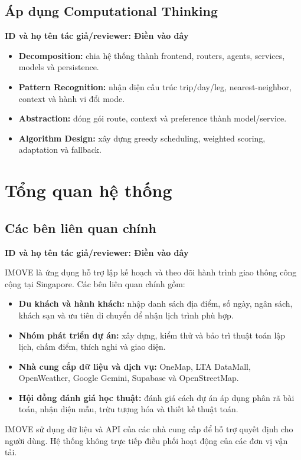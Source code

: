 \documentclass[12pt,a4paper]{article}
\newcommand{\tacgia}{%
  \begin{tcolorbox}[colback=blue!3,colframe=blue!25,boxrule=0.4pt,arc=1mm]
    \small\textbf{ID và họ tên tác giả/reviewer: Điền vào đây}
  \end{tcolorbox}
}
\begin{document}
\subsection{Áp dụng Computational Thinking}
\tacgia

\begin{itemize}
    \item \textbf{Decomposition:} chia hệ thống thành frontend, routers, agents, services, models và persistence.
    \item \textbf{Pattern Recognition:} nhận diện cấu trúc trip/day/leg, nearest-neighbor, context và hành vi đổi mode.
    \item \textbf{Abstraction:} đóng gói route, context và preference thành model/service.
    \item \textbf{Algorithm Design:} xây dựng greedy scheduling, weighted scoring, adaptation và fallback.
\end{itemize}

\section{Tổng quan hệ thống}

\subsection{Các bên liên quan chính}
\tacgia

IMOVE là ứng dụng hỗ trợ lập kế hoạch và theo dõi hành trình giao thông công cộng tại Singapore. Các bên liên quan chính gồm:

\begin{itemize}
    \item \textbf{Du khách và hành khách:} nhập danh sách địa điểm, số ngày, ngân sách, khách sạn và ưu tiên di chuyển để nhận lịch trình phù hợp.
    \item \textbf{Nhóm phát triển dự án:} xây dựng, kiểm thử và bảo trì thuật toán lập lịch, chấm điểm, thích nghi và giao diện.
    \item \textbf{Nhà cung cấp dữ liệu và dịch vụ:} OneMap, LTA DataMall, OpenWeather, Google Gemini, Supabase và OpenStreetMap.
    \item \textbf{Hội đồng đánh giá học thuật:} đánh giá cách dự án áp dụng phân rã bài toán, nhận diện mẫu, trừu tượng hóa và thiết kế thuật toán.
\end{itemize}

IMOVE sử dụng dữ liệu và API của các nhà cung cấp để hỗ trợ quyết định cho người dùng. Hệ thống không trực tiếp điều phối hoạt động của các đơn vị vận tải.
\end{document}
